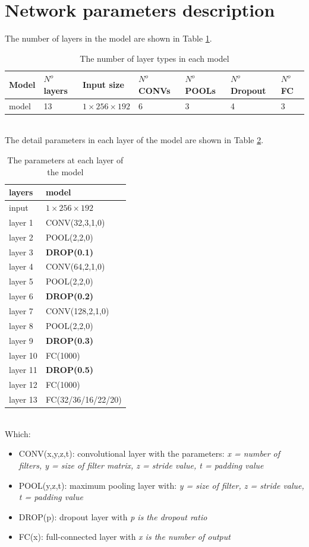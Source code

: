 \documentclass[12pt,a4paper]{article}
\begin{document}
\section{Network parameters description}
\label{apa}
The number of layers in the model are shown in Table \ref{numlayers}.
\begin{table}[h!]
	\centering
	\begin{tabular}{l p{1.2cm} p{3cm} p{2cm} p{1.2cm} p{2cm} p{2cm}}
		Model & $N^o$ layers & Input size & $N^o$ CONVs & $N^o$ POOLs & $N^o$ Dropout & $N^o$ FC \\ \hline
		model & 13 & $1 \times 256 \times 192$ & 6 & 3 & 4 & 3 \\ \hline
	\end{tabular}
	\caption{The number of layer types in each model}
	\label{numlayers}
\end{table}~\\
The detail parameters in each layer of the model are shown in Table \ref{modelparameters}.
\begin{table}[h!]
	\centering
	\begin{tabular}{l p{3cm} }
		layers &  model  \\ \hline
		input & $1 \times 256 \times 192$ \\ \hline
 		layer 1 & CONV(32,3,1,0) \\ \hline
		layer 2 & POOL(2,2,0) \\ \hline
		layer 3 & \textbf{DROP(0.1)} \\ \hline
		layer 4 & CONV(64,2,1,0) \\ \hline
		layer 5 & POOL(2,2,0) \\ \hline
		layer 6 & \textbf{DROP(0.2)} \\ \hline
		layer 7 & CONV(128,2,1,0) \\ \hline
		layer 8 & POOL(2,2,0) \\ \hline
		layer 9 & \textbf{DROP(0.3)} \\ \hline
		layer 10 & FC(1000) \\ \hline
		layer 11 & \textbf{DROP(0.5)} \\ \hline
		layer 12& FC(1000) \\ \hline
		layer 13 & FC(32/36/16/22/20) \\ \hline
	\end{tabular}
	\caption{The parameters at each layer of the model}
	\label{modelparameters}
\end{table}~\\
Which:
\begin{itemize}
	\item CONV(x,y,z,t): convolutional layer with the parameters: \textit{x = number of filters, y = size of filter matrix, z = stride value, t = padding value}
	\item POOL(y,z,t): maximum pooling layer with: \textit{y = size of filter, z = stride value, t = padding value}
	\item DROP(p): dropout layer with \textit{p is the dropout ratio}
	\item FC(x): full-connected layer with \textit{x is the number of output}
\end{itemize}
\end{document}
